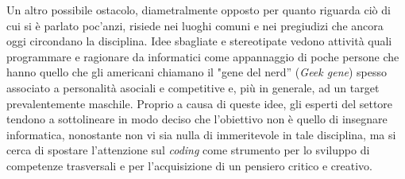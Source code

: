 Un altro possibile ostacolo, diametralmente opposto per quanto riguarda ciò di cui si è parlato poc'anzi, risiede nei luoghi comuni e nei pregiudizi che ancora oggi circondano la disciplina.
Idee sbagliate e stereotipate vedono attività quali programmare e ragionare da informatici come appannaggio di poche persone che hanno quello che gli americani
chiamano il "gene del nerd” (\textit{Geek gene}) %
spesso associato a personalità asociali e competitive e, più in generale, ad un target prevalentemente maschile. Proprio a causa di queste idee, gli esperti del settore 
tendono a sottolineare in modo deciso che l'obiettivo non è quello di insegnare informatica, nonostante non vi sia nulla di immeritevole in tale disciplina, ma si cerca di spostare l'attenzione 
sul \textit{coding} come strumento per lo sviluppo di competenze trasversali e per l'acquisizione di un pensiero critico e creativo.

